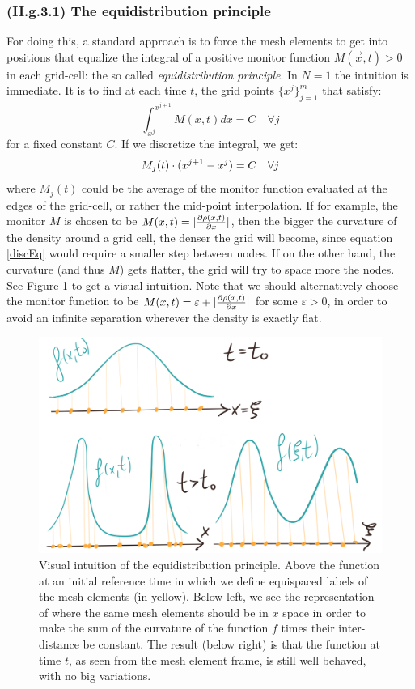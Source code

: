 \documentclass[11pt, a4paper]{article} %
\begin{document}
\subsubsection*{(II.g.3.1) The equidistribution principle \vspace{-0.2cm}}
For doing this, a standard approach is to force the mesh elements to get into positions that equalize the integral of a positive monitor function $M(\vec{x},t)>0$ in each grid-cell: the so called {\em equidistribution principle}. In $N=1$ the intuition is immediate. It is to find at each time $t$, the grid points $\{x^j\}_{j=1}^m$ that satisfy:\vspace{-0.1cm}
\begin{equation}
\int^{x^{j+1}}_{x^j} M(x,t) dx =C \quad \forall j
\end{equation}
for a fixed constant $C$. If we discretize the integral, we get:
\begin{equation}\label{discEq}
M_j(t)\cdot (x^{j+1}-x^j)=C \quad \forall j \vspace{-0.1cm}
\end{equation}
where $M_j(t)$ could be the average of the monitor function evaluated at the edges of the grid-cell, or rather the mid-point interpolation. If for example, the monitor $M$ is chosen to be $M(x,t)=|\pdv{\rho(x,t)}{x}|$, then the bigger the curvature of the density around a grid cell, the denser the grid will become, since equation \eqref{discEq} would require a smaller step between nodes. If on the other hand, the curvature (and thus $M$) gets flatter, the grid will try to space more the nodes. See Figure \ref{fig:equid} to get a visual intuition. Note that we should alternatively choose the monitor function to be $M(x,t)=\varepsilon+|\pdv{\rho(x,t)}{x}|$ for some $\varepsilon>0$, in order to avoid an infinite separation wherever the density is exactly flat.\vspace{0.1cm}
\begin{figure}[h!]
  \centering
    \includegraphics[width=0.50\linewidth]{8equidistribution.png}
  \caption{ Visual intuition of the equidistribution principle. Above the function at an initial reference time in which we define equispaced labels of the mesh elements (in yellow). Below left, we see the representation of where the same mesh elements should be in $x$ space in order to make the sum of the curvature of the function $f$ times their inter-distance be constant. The result (below right) is that the function at time $t$, as seen from the mesh element frame, is still well behaved, with no big variations. }
  \label{fig:equid}
\end{figure}
\end{document}
